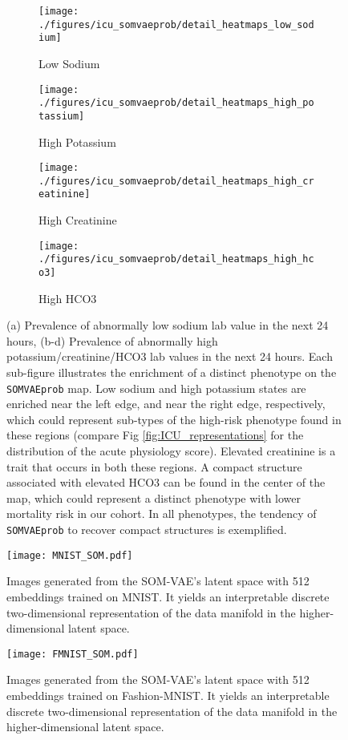 \documentclass{article}
\begin{document}
\begin{figure}[h!]
\centering
\begin{subfigure}[t]{0.22\textwidth}
\centering
\texttt{[image: ./figures/icu\_somvaeprob/detail\_heatmaps\_low\_sodium]}
\caption{Low Sodium}
\end{subfigure}
\begin{subfigure}[t]{0.22\textwidth}
\centering
\texttt{[image: ./figures/icu\_somvaeprob/detail\_heatmaps\_high\_potassium]}
\caption{High Potassium}
\end{subfigure}
\begin{subfigure}[t]{0.22\textwidth}
\centering
\texttt{[image: ./figures/icu\_somvaeprob/detail\_heatmaps\_high\_creatinine]}
\caption{High Creatinine}
\end{subfigure}
\begin{subfigure}[t]{0.22\textwidth}
\centering
\texttt{[image: ./figures/icu\_somvaeprob/detail\_heatmaps\_high\_hco3]}
\caption{High HCO3}
\end{subfigure}



\caption{(a) Prevalence of abnormally low sodium lab value in the next 24 
         hours, (b-d) Prevalence of abnormally high potassium/creatinine/HCO3 lab values in the next 24 hours. Each
         sub-figure illustrates the enrichment of a distinct phenotype on the \texttt{SOMVAEprob} map. Low sodium
         and high potassium states are enriched near the left edge, and near the right edge, respectively, which could
         represent sub-types of the high-risk phenotype found in these regions (compare Fig \ref{fig:ICU_representations}
         for the distribution of the acute physiology score). Elevated creatinine is a trait that occurs in both these regions.
         A compact structure associated with elevated HCO3 can be found in the center of the map, which could represent 
         a distinct phenotype with lower mortality risk in our cohort. In all phenotypes, the tendency of \texttt{SOMVAEprob}
         to recover compact structures is exemplified.}
\end{figure}
 

\begin{figure}[h]
    \centering
    \texttt{[image: MNIST\_SOM.pdf]}
    \caption{Images generated from the SOM-VAE's latent space with 512 embeddings trained on MNIST. It yields an interpretable discrete two-dimensional representation of the data manifold in the higher-dimensional latent space.}
    \label{fig:MNIST_SOM}
\end{figure}

\begin{figure}[h]
    \centering
    \texttt{[image: FMNIST\_SOM.pdf]}
    \caption{Images generated from the SOM-VAE's latent space with 512 embeddings trained on Fashion-MNIST. It yields an interpretable discrete two-dimensional representation of the data manifold in the higher-dimensional latent space.}
    \label{fig:FMNIST_SOM}
\end{figure}




 
	
\end{document}
